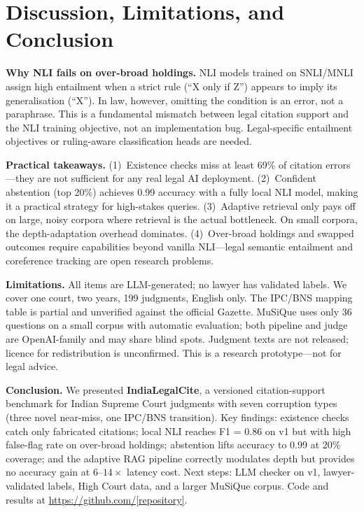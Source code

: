 \documentclass[conference]{IEEEtran}
\begin{document}
\section{Discussion, Limitations, and Conclusion}
\label{sec:discussion}

\textbf{Why NLI fails on over-broad holdings.} NLI models trained on SNLI/MNLI assign high
entailment when a strict rule (``X only if Z'') appears to imply its generalisation (``X''). In
law, however, omitting the condition is an error, not a paraphrase. This is a fundamental
mismatch between legal citation support and the NLI training objective, not an implementation bug.
Legal-specific entailment objectives or ruling-aware classification heads are needed.

\textbf{Practical takeaways.}
(1)~Existence checks miss at least 69\% of citation errors---they are not sufficient for any real
legal AI deployment.
(2)~Confident abstention (top 20\%) achieves 0.99 accuracy with a fully local NLI model, making it
a practical strategy for high-stakes queries.
(3)~Adaptive retrieval only pays off on large, noisy corpora where retrieval is the actual
bottleneck. On small corpora, the depth-adaptation overhead dominates.
(4)~Over-broad holdings and swapped outcomes require capabilities beyond vanilla NLI---legal
semantic entailment and coreference tracking are open research problems.

\textbf{Limitations.} All items are LLM-generated; no lawyer has validated labels. We cover one
court, two years, 199 judgments, English only. The IPC/BNS mapping table is partial and unverified
against the official Gazette. MuSiQue uses only 36 questions on a small corpus with automatic
evaluation; both pipeline and judge are OpenAI-family and may share blind spots. Judgment texts are
not released; licence for redistribution is unconfirmed. This is a research prototype---not for
legal advice.

\textbf{Conclusion.} We presented \textbf{IndiaLegalCite}, a versioned citation-support benchmark
for Indian Supreme Court judgments with seven corruption types (three novel near-miss, one
IPC/BNS transition). Key findings: existence checks catch only fabricated citations; local NLI
reaches F1 = 0.86 on v1 but with high false-flag rate on over-broad holdings; abstention lifts
accuracy to 0.99 at 20\% coverage; and the adaptive RAG pipeline correctly modulates depth but
provides no accuracy gain at $6$--$14\times$ latency cost. Next steps: LLM checker on v1,
lawyer-validated labels, High Court data, and a larger MuSiQue corpus. Code and results at
\url{https://github.com/[repository]}.
\end{document}
